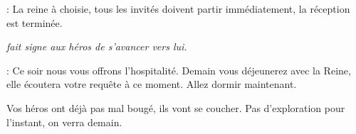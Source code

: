 \begin{quotebox}
\noindent\textbf{}: La reine à choisie, tous les invités doivent partir immédiatement, la réception est terminée.

\emph{ fait signe aux héros de s’avancer vers lui.}

\noindent\textbf{}: Ce soir nous vous offrons l’hospitalité. Demain vous déjeunerez avec la Reine, elle écoutera votre requête à ce moment. Allez dormir maintenant.
\end{quotebox}

Vos héros ont déjà pas mal bougé, ils vont se coucher. Pas d’exploration pour l’instant, on verra demain.
